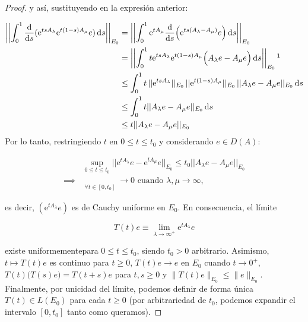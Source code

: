 \begin{proof}
    y así, sustituyendo en la expresión anterior:

    \begin{align*}
        \left | \left | \int_0^1 \frac{\dd}{\dd s}(\mathrm{e}^{tsA_\lambda}\mathrm{e}^{t(1-s)A_\mu}e) \, \dd s \right | \right |_{E_0} &= \left | \left | \int_0^1 \mathrm{e}^{tA_\mu}\frac{\dd}{\dd s}\Big(\mathrm{e}^{ts(A_\lambda - A_\mu)}e\Big) \, \dd s \right | \right |_{E_0}\\
        &= \left | \left | \int_0^1 t\mathrm{e}^{tsA_\lambda}\mathrm{e}^{t(1-s)A_\mu}\Big(A_\lambda e - A_\mu e\Big) \, \dd s \right | \right |_{E_0}\footnotemark\\
        &\leq\int_0^1 t \, ||\mathrm{e}^{tsA_\lambda}||_{E_0} \, ||\mathrm{e}^{t(1-s)A_\mu}||_{E_0} \, ||A_\lambda e - A_\mu e||_{E_0} \, \dd s\\
        &\leq \int_0^1 t ||A_\lambda e - A_\mu e||_{E_0} \, \dd s\\
        &\leq t ||A_\lambda e - A_\mu e||_{E_0}
    \end{align*}
    Por lo tanto, restringiendo $t$ en $0 \leq t \leq t_0$ y considerando $e \in D(A)$:

    \begin{align*}
        &\sup_{0 \leq t \leq t_0} ||\mathrm{e}^{tA_\lambda}e - \mathrm{e}^{tA_\mu}e||_{E_0} \leq t_0 ||A_\lambda e - A_\mu e||_{E_0}\\
        \implies& \mathop{\left\lVert \mathrm{e}^{tA_\lambda}e - \mathrm{e}^{tA_\mu}e \right\rVert_{E_0}} \limits_{\displaystyle \forall t \in [0, t_0]} \rightarrow 0 \text{ cuando } \lambda, \mu \rightarrow \infty,
    \end{align*}

    es decir, $(\mathrm{e}^{tA_\lambda}e)$ es de Cauchy uniforme en $E_0$. En consecuencia, el límite

    \[T(t)e \equiv \lim_{\lambda \rightarrow \infty^+} \mathrm{e}^{tA_\lambda}e\]

    existe uniformemente\footnotemark para $0 \leq t \leq t_0$, siendo $t_0 > 0$ arbitrario.
    Asimismo, $t \mapsto T(t)e$ es continuo para $t \geq 0$, $T(t)e \rightarrow e$ en $E_0$ cuando $t \rightarrow 0^+$, $T(t)\big(T(s)e\big) = T(t+s)e$ para $t,s \geq 0$ y $\lVert T(t)e\rVert_{E_0} \leq \lVert e \rVert_{E_0}$. Finalmente, por unicidad del límite, podemos definir de forma única\footnotemark $T(t) \in L(E_0)$ para cada $t \geq 0$ (por arbitrariedad de $t_0$, podemos expandir el intervalo $[0, t_0]$ tanto como queramos).
    

\end{proof}
